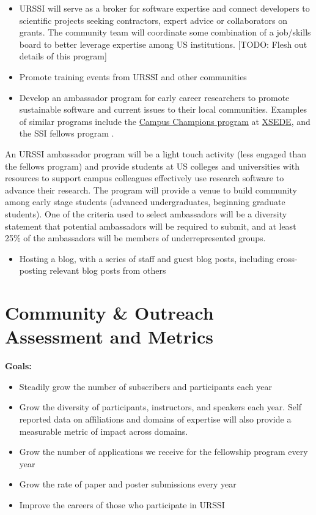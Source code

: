 \documentclass[
]{book}
\providecommand{\tightlist}{%
  \setlength{\itemsep}{0pt}\setlength{\parskip}{0pt}}
\begin{document}
\begin{itemize}
\tightlist
\item
  URSSI will serve as a broker for software expertise and connect developers to scientific projects seeking contractors, expert advice or collaborators on grants. The community team will coordinate some combination of a job/skills board to better leverage expertise among US institutions. {[}TODO: Flesh out details of this program{]}
\item
  Promote training events from URSSI and other communities
\item
  Develop an ambassador program for early career researchers to promote sustainable software and current issues to their local communities. Examples of similar programs include the \href{https://www.xsede.org/community-engagement/campus-champions}{Campus Champions program} at \href{https://www.xsede.org/}{XSEDE}, and the SSI fellows program \citep{10.12688/f1000research.16231.1}.
\end{itemize}

An URSSI ambassador program will be a light touch activity (less engaged than the fellows program) and provide students at US colleges and universities with resources to support campus colleagues effectively use research software to advance their research. The program will provide a venue to build community among early stage students (advanced undergraduates, beginning graduate students).
One of the criteria used to select ambassadors will be a diversity statement that potential ambassadors will be required to submit, and at least 25\% of the ambassadors will be members of underrepresented groups.

\begin{itemize}
\tightlist
\item
  Hosting a blog, with a series of staff and guest blog posts, including cross-posting relevant blog posts from others
\end{itemize}

\hypertarget{community-outreach-assessment-and-metrics}{%
\section{Community \& Outreach Assessment and Metrics}\label{community-outreach-assessment-and-metrics}}

\textbf{Goals: }

\begin{itemize}
\tightlist
\item
  Steadily grow the number of subscribers and participants each year
\item
  Grow the diversity of participants, instructors, and speakers each year. Self reported data on affiliations and domains of expertise will also provide a measurable metric of impact across domains.
\item
  Grow the number of applications we receive for the fellowship program every year
\item
  Grow the rate of paper and poster submissions every year
\item
  Improve the careers of those who participate in URSSI
\end{itemize}
\end{document}
